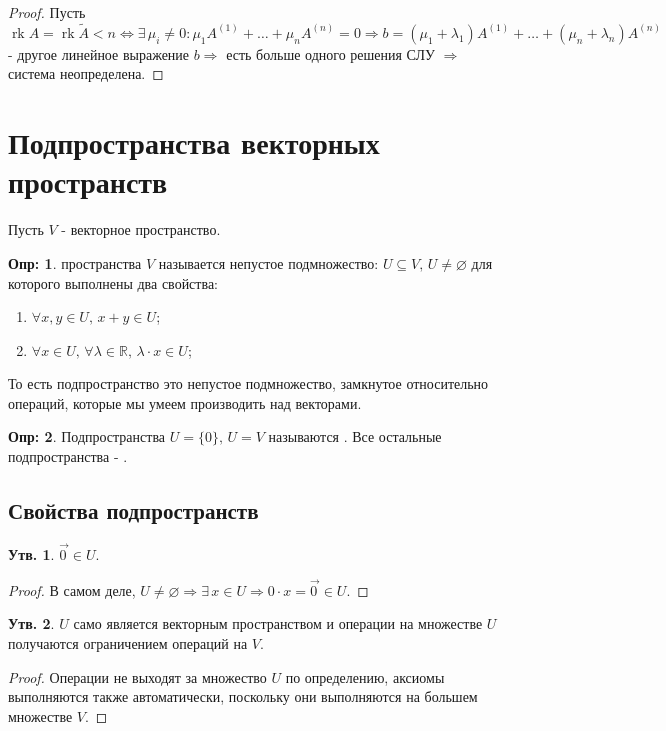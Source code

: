\documentclass[12pt]{article}
\newcommand{\MR}{\mathbb{R}}
\newcommand{\VN}{\varnothing}
\theoremstyle{definition}
\newtheorem{defn}{Опр:}
\newtheorem{prop}{Утв.}
\DeclareMathOperator{\rk}{\text{rk}}
\newcommand{\wte}[1]{\widetilde{#1}}
\newcommand{\vecm}[1]{\overrightarrow{#1\,}}
\begin{document}
\begin{proof}
	Пусть $\rk{A} = \rk{\wte{A}} < n \Leftrightarrow \exists \, \mu_i \neq 0 \colon \mu_1 A^{(1)} + \dotsc  + \mu_n A^{(n)} = 0 \Rightarrow b = (\mu_1 + \lambda_1) A^{(1)} + \dotsc + (\mu_n + \lambda_n )A^{(n)}$ - другое линейное выражение $b \Rightarrow$ есть больше одного решения СЛУ $\Rightarrow$ система неопределена.  
\end{proof}

\newpage

\section*{Подпространства векторных пространств}

Пусть $V$ - векторное пространство. 

\begin{defn}
	 пространства $V$ называется непустое подмножество: $U \subseteq V, \, U \neq \VN$ для которого выполнены два свойства:
	\begin{enumerate}[label=\arabic*)]
		\item $\forall x,y \in U, \, x + y \in U$;
		\item $\forall x \in U, \, \forall \lambda \in \MR, \, \lambda{\cdot}x \in U$;
	\end{enumerate}
	То есть подпространство это непустое подмножество, замкнутое относительно операций, которые мы умеем производить над векторами.
\end{defn}
\begin{defn}
	Подпространства $U = \{0\}, \, U = V$ называются . Все остальные подпространства - .
\end{defn}

\subsection*{Свойства подпространств}

\begin{prop}
	$\vecm{0} \in U$.
\end{prop}
\begin{proof}
	В самом деле, $U \neq \VN \Rightarrow \exists \, x \in U \Rightarrow 0{\cdot}x  = \vecm{0} \in U$.
\end{proof}

\begin{prop}
	$U$ само является векторным пространством и операции на множестве $U$ получаются ограничением операций на $V$.
\end{prop}
\begin{proof}
	Операции не выходят за множество $U$ по определению, аксиомы выполняются также автоматически, поскольку они выполняются на большем множестве $V$.
\end{proof}
\end{document}
